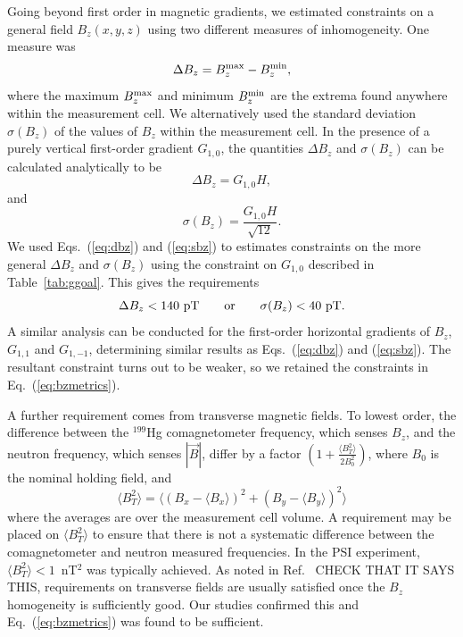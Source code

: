 \documentclass[preprint,12pt]{elsarticle}
\begin{document}
Going beyond first order in magnetic gradients, we estimated
constraints on a general field $B_z(x,y,z)$ using two different
measures of inhomogeneity.  One measure was
\begin{equation}
  \Delta B_z = B_z^{\rm max}-B_z^{\rm min},
\end{equation}
where the maximum $B_z^{\rm max}$ and minimum $B_z^{\rm min}$ are the
extrema found anywhere within the measurement cell.  We alternatively
used the standard deviation $\sigma(B_z)$ of the values of $B_z$
within the measurement cell.  In the presence of a purely vertical
first-order gradient $G_{1,0}$, the quantities $\Delta B_z$ and
$\sigma(B_z)$ can be calculated analytically to be
\begin{equation}
  \Delta B_z = G_{1,0}H,
  \label{eq:dbz}
\end{equation}
and
\begin{equation}
  \sigma(B_z)=\frac{G_{1,0}H}{\sqrt{12}}.
  \label{eq:sbz}
\end{equation}
We used Eqs.~(\ref{eq:dbz}) and (\ref{eq:sbz}) to estimates
constraints on the more general $\Delta B_z$ and $\sigma(B_z)$ using
the constraint on $G_{1,0}$ described in Table~\ref{tab:ggoal}.  This
gives the requirements
\begin{equation}
  \Delta B_z<140~{\rm pT}
  \qquad\text{or}\qquad
  \sigma(B_z)<40~{\rm pT}.
  \label{eq:bzmetrics}
\end{equation}
A similar analysis can be conducted for the first-order horizontal
gradients of $B_z$, $G_{1,1}$ and $G_{1,-1}$, determining similar
results as Eqs.~(\ref{eq:dbz}) and (\ref{eq:sbz}).  The resultant
constraint turns out to be weaker, so we retained the constraints in
Eq.~(\ref{eq:bzmetrics}).

A further requirement comes from transverse magnetic fields. To lowest
order, the difference between the $^{199}$Hg comagnetometer frequency,
which senses $B_z$, and the neutron frequency, which senses
$|\vec{B}|$, differ by a factor $(1+\frac{\langle
  B_T^2\rangle}{2B_0^2})$, where $B_0$ is the nominal holding field,
and
\begin{equation}
  \langle B_T^2\rangle=\langle(B_x-\langle B_x\rangle)^2+(B_y-\langle B_y\rangle)^2\rangle
\end{equation}
where the averages are over the measurement cell volume.  A
requirement may be placed on $\langle B_T^2\rangle$ to ensure that
there is not a systematic difference between the comagnetometer and
neutron measured frequencies.  In the PSI experiment, $\langle
B_T^2\rangle < 1$~nT$^2$ was typically achieved.  As noted in
Ref.~\cite{bib:Abel2019} CHECK THAT IT SAYS THIS, requirements on
transverse fields are usually satisfied once the $B_z$ homogeneity is
sufficiently good.  Our studies confirmed this and
Eq.~(\ref{eq:bzmetrics}) was found to be sufficient.
\end{document}
